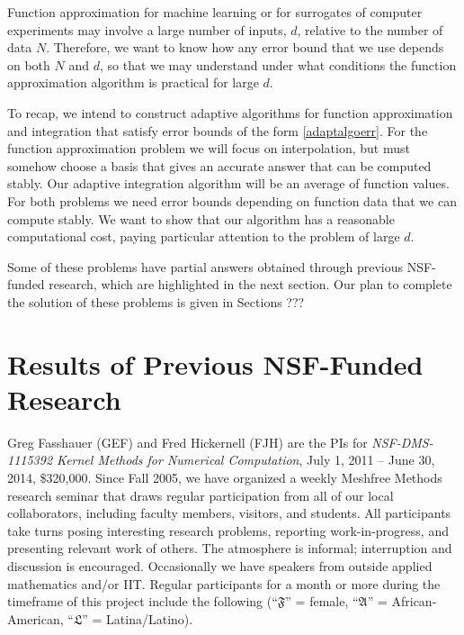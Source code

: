 \documentclass[11pt]{NSFamsart}
\newcommand{\fA}{\mathfrak{A}}
\newcommand{\fF}{\mathfrak{F}}
\newcommand{\fL}{\mathfrak{L}}
\begin{document}
Function approximation for machine learning or for surrogates of computer experiments may involve a large number of inputs, $d$, relative to the number of data $N$.  Therefore, we want to know how any error bound that we use depends on both $N$ and $d$, so that we may understand under what conditions the function approximation algorithm is practical for large $d$.

To recap, we intend to construct adaptive algorithms for function approximation and integration that satisfy error bounds of the form \eqref{adaptalgoerr}.  For the function approximation problem we will focus on interpolation, but must somehow choose a basis that gives an accurate answer that can be computed stably.  Our adaptive integration algorithm will be an average of function values.  For both problems we need error bounds depending on function data that we can compute stably.  We want to show that our algorithm has a reasonable computational cost, paying particular attention to the problem of large $d$.

Some of these problems have partial answers obtained through previous NSF-funded research, which are highlighted in the next section.  Our plan to complete the solution of these problems is  given in Sections ???

\section{Results of Previous NSF-Funded Research}\label{SectPrevious}

Greg Fasshauer (GEF) and Fred Hickernell (FJH) are the PIs for \emph{NSF-DMS-1115392 Kernel Methods for Numerical Computation}, July 1, 2011 -- June 30, 2014, \$320,000.  Since Fall 2005, we have organized a weekly Meshfree Methods research seminar that draws regular participation from all of our local collaborators, including faculty members, visitors, and students.  All participants take turns posing interesting research problems, reporting work-in-progress, and presenting relevant work of others.  The atmosphere is informal; interruption and discussion is encouraged.  Occasionally we have speakers from outside applied mathematics and/or IIT. Regular participants for a month or more during the timeframe of this project include the following (``$\fF$'' = female,  ``$\fA$'' = African-American, ``$\fL$'' = Latina/Latino).
\end{document}
